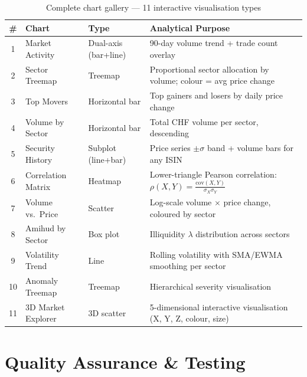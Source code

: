 \documentclass[
  11pt,
  a4paper,
  twoside,
  openany
]{report}
\begin{document}
\begin{table}[H]
\centering
\caption{Complete chart gallery — 11 interactive visualisation types}
\label{tab:chart-gallery}
\small
\begin{tabularx}{\textwidth}{c l l X}
\toprule
\textbf{\#} & \textbf{Chart} & \textbf{Type} & \textbf{Analytical Purpose} \\
\midrule
1  & Market Activity      & Dual-axis (bar+line) & 90-day volume trend + trade count overlay \\
2  & Sector Treemap       & Treemap              & Proportional sector allocation by volume; colour = avg price change \\
3  & Top Movers           & Horizontal bar       & Top gainers and losers by daily price change \\
4  & Volume by Sector     & Horizontal bar       & Total CHF volume per sector, descending \\
5  & Security History     & Subplot (line+bar)   & Price series $\pm\sigma$ band + volume bars for any ISIN \\
6  & Correlation Matrix   & Heatmap              & Lower-triangle Pearson correlation: $\rho(X,Y) = \frac{\text{cov}(X,Y)}{\sigma_X \sigma_Y}$ \\
7  & Volume vs.\ Price   & Scatter              & Log-scale volume $\times$ price change, coloured by sector \\
8  & Amihud by Sector     & Box plot             & Illiquidity $\lambda$ distribution across sectors \\
9  & Volatility Trend     & Line                 & Rolling volatility with SMA/EWMA smoothing per sector \\
10 & Anomaly Treemap      & Treemap              & Hierarchical severity visualisation \\
11 & 3D Market Explorer   & 3D scatter           & 5-dimensional interactive visualisation (X, Y, Z, colour, size) \\
\bottomrule
\end{tabularx}
\end{table}


\chapter{Quality Assurance \& Testing}
\label{ch:testing}
\end{document}
